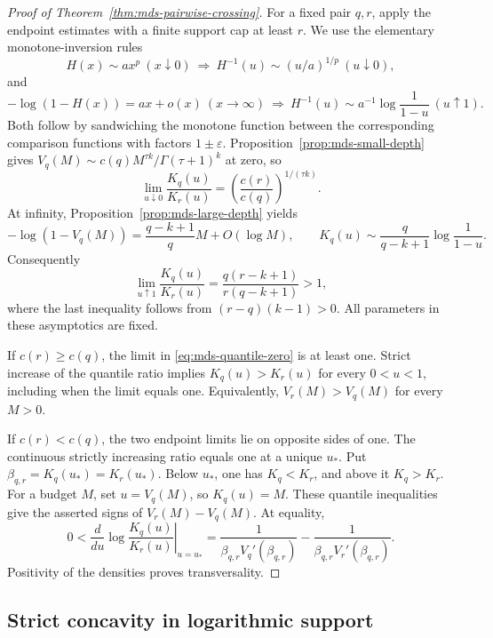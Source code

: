 \documentclass[11pt]{article}
\theoremstyle{definition}
\theoremstyle{remark}
\newcommand{\1}{\mathbf 1}
\begin{document}
\begin{proof}[Proof of Theorem~\ref{thm:mds-pairwise-crossing}]
For a fixed pair \(q,r\), apply the endpoint estimates with a finite
support cap at least \(r\).  We use the elementary monotone-inversion
rules
\[
 H(x)\sim ax^p\ (x\downarrow0)
 \ \Longrightarrow\
 H^{-1}(u)\sim (u/a)^{1/p}\ (u\downarrow0),
\]
and
\[
 -\log(1-H(x))=ax+o(x)\ (x\to\infty)
 \ \Longrightarrow\
 H^{-1}(u)\sim a^{-1}\log\frac1{1-u}\ (u\uparrow1).
\]
Both follow by sandwiching the monotone function between the
corresponding comparison functions with factors \(1\pm\varepsilon\).
Proposition~\ref{prop:mds-small-depth} gives
\(V_q(M)\sim c(q)M^{\tau k}/\Gamma(\tau+1)^k\) at zero, so
\begin{equation}\label{eq:mds-quantile-zero}
 \lim_{u\downarrow0}\frac{K_q(u)}{K_r(u)}
 =\left(\frac{c(r)}{c(q)}\right)^{1/(\tau k)}.
\end{equation}
At infinity, Proposition~\ref{prop:mds-large-depth} yields
\[
 -\log(1-V_q(M))=\frac{q-k+1}{q}M+O(\log M),
 \qquad
 K_q(u)\sim\frac{q}{q-k+1}\log\frac1{1-u}.
\]
Consequently
\begin{equation}\label{eq:mds-quantile-one}
 \lim_{u\uparrow1}\frac{K_q(u)}{K_r(u)}
 =\frac{q(r-k+1)}{r(q-k+1)}>1,
\end{equation}
where the last inequality follows from \((r-q)(k-1)>0\).
All parameters in these asymptotics are fixed.

If \(c(r)\ge c(q)\), the limit in \eqref{eq:mds-quantile-zero}
is at least one. Strict increase of the quantile ratio implies
\(K_q(u)>K_r(u)\) for every \(0<u<1\), including when the limit
equals one. Equivalently, \(V_r(M)>V_q(M)\) for every \(M>0\).

If \(c(r)<c(q)\), the two endpoint limits lie on opposite sides
of one. The continuous strictly increasing ratio equals one at a
unique \(u_*\). Put \(\beta_{q,r}=K_q(u_*)=K_r(u_*)\).
Below \(u_*\), one has \(K_q<K_r\), and above it \(K_q>K_r\).
For a budget \(M\), set \(u=V_q(M)\), so \(K_q(u)=M\).
These quantile inequalities give the asserted signs of
\(V_r(M)-V_q(M)\). At equality,
\[
 0<\left.\frac{d}{du}\log\frac{K_q(u)}{K_r(u)}\right|_{u=u_*}
 =\frac1{\beta_{q,r}V_q'(\beta_{q,r})}
  -\frac1{\beta_{q,r}V_r'(\beta_{q,r})}.
\]
Positivity of the densities proves transversality.
\end{proof}

\subsection{Strict concavity in logarithmic support}
\end{document}
